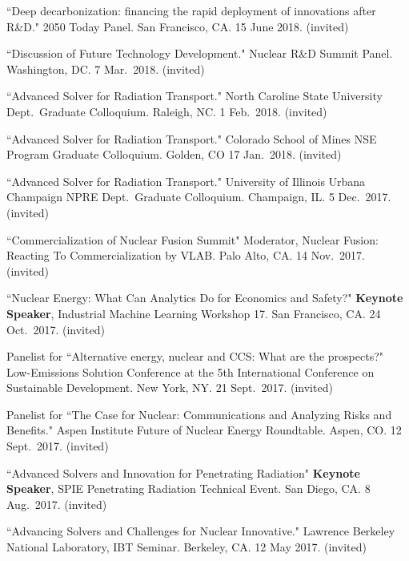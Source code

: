 \begin{bibsection}
\item ``Deep decarbonization: financing the rapid deployment
of innovations after R\&D." 2050 Today Panel. San Francisco, CA. 15 June 2018. (invited)

\item ``Discussion of Future Technology Development." Nuclear R\&D Summit Panel. Washington, DC. 7 Mar.\ 2018. (invited)

\item ``Advanced Solver for Radiation Transport." North Caroline State University Dept.\ Graduate Colloquium. Raleigh, NC. 1 Feb.\ 2018. (invited)

\item  ``Advanced Solver for Radiation Transport." Colorado School of Mines NSE Program Graduate Colloquium. Golden, CO 17 Jan.\ 2018. (invited)

\item  ``Advanced Solver for Radiation Transport." University of Illinois Urbana Champaign NPRE Dept.\ Graduate Colloquium. Champaign, IL. 5 Dec.\ 2017. (invited)

\item  ``Commercialization of  Nuclear Fusion Summit" Moderator, Nuclear Fusion: Reacting To Commercialization by VLAB. Palo Alto, CA. 14 Nov.\ 2017. (invited)

\item ``Nuclear Energy: What Can Analytics Do for Economics and Safety?" \textbf{Keynote Speaker}, Industrial Machine Learning Workshop 17. San Francisco, CA. 24 Oct.\ 2017. (invited)

\item Panelist for ``Alternative energy, nuclear and CCS: What are the prospects?" Low-Emissions Solution Conference at the 5th International Conference on Sustainable Development. New York, NY. 21  Sept.\ 2017. (invited)

\item Panelist for ``The Case for Nuclear: Communications and Analyzing Risks and Benefits." Aspen Institute Future of Nuclear Energy Roundtable. Aspen, CO. 12  Sept.\ 2017. (invited)

\item ``Advanced Solvers and Innovation for Penetrating Radiation" \textbf{Keynote Speaker}, SPIE Penetrating Radiation Technical Event. San Diego, CA. 8 Aug.\ 2017. (invited)

\item ``Advancing Solvers and Challenges for Nuclear Innovative." Lawrence Berkeley National Laboratory, IBT Seminar. Berkeley, CA. 12 May 2017. (invited)


\end{bibsection}
